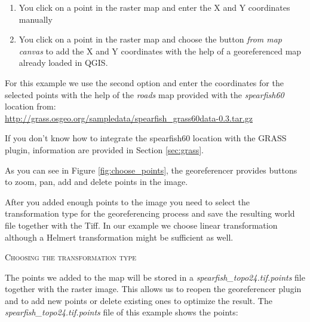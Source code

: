 \begin{enumerate}
\item You click on a point in the raster map and enter the X and Y 
coordinates manually
\item You click on a point in the raster map and choose the button
\textsl{from map canvas} to add the X and Y coordinates with the help 
of a georeferenced map already loaded in QGIS.
\end{enumerate}


For this example we use the second option and enter the coordinates for the
selected points with the help of the \textsl{roads} map provided with the 
\textsl{spearfish60} location from: \\
\url{http://grass.osgeo.org/sampledata/spearfish\_grass60data-0.3.tar.gz}

If you don't know how to integrate the spearfish60 location with the GRASS plugin, 
information are provided in Section \ref{sec:grass}.

As you can see in Figure \ref{fig:choose_points}, the georeferencer provides buttons 
to zoom, pan, add and delete points in the image.

After you added enough points to the image you need to select the transformation 
type for the georeferencing process and save the resulting world file together with 
the Tiff. In our example we choose linear transformation although a Helmert 
transformation might be sufficient as well.

\begin{Tip}\caption{\textsc{Choosing the transformation type}}
\end{Tip} 

The points we added to the map will be stored in a \textsl{spearfish\_topo24.tif.points} file together 
with the raster image. This allows us to reopen the georeferencer plugin and to add new points or delete 
existing ones to optimize the result. The \textsl{spearfish\_topo24.tif.points} file of this 
example shows the points:

